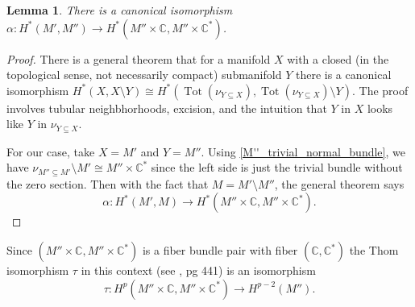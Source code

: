 \documentclass[article,twoside]{article}
\newcommand{\CC}{\mathbb{C}}
\newcommand{\tot}{\operatorname{Tot}}
\theoremstyle{plain}
\theoremstyle{plain}
\newtheorem{lemma}[lemma]{Lemma}
\theoremstyle{plain}
\theoremstyle{plain}
\theoremstyle{plain}
\theoremstyle{definition}
\theoremstyle{definition}
\theoremstyle{definition}
\theoremstyle{remark}
\theoremstyle{remark}
\begin{document}
\begin{lemma}\label{M',M''_trivial_fiber_pair_bundle}
	There is a canonical isomorphism $\alpha:H^*(M',M'')\to H^*(M''\times\CC,M''\times\CC^*)$.
\end{lemma}
\begin{proof}
	There is a general theorem that for a manifold $X$ with a closed (in the topological sense, not necessarily compact) submanifold $Y$ there is a canonical isomorphism $H^*(X,X\setminus Y)\cong H^*(\tot(\nu_{Y\subseteq X}),\tot(\nu_{Y\subseteq X})\setminus {Y})$. The proof involves tubular neighbhorhoods, excision, and the intuition that $Y$ in $X$ looks like ${Y}$ in $\nu_{Y\subseteq X}$. 
	
	For our case, take $X = M'$ and $Y=M''$. Using \autoref{M''_trivial_normal_bundle}, we have $\nu_{M''\subseteq M'}\setminus{M'}\cong M''\times \CC^*$ since the left side is just the trivial bundle without the zero section. Then with the fact that $M = M'\setminus M''$, the general theorem says
	$$
	\alpha: H^*(M',M)\to H^*(M''\times\CC,M''\times\CC^*).
	$$
\end{proof}


%
%
%
%
%
%
%

Since $(M''\times\CC,M''\times\CC^*)$ is a fiber bundle pair with fiber $(\CC,\CC^*)$ the Thom isomorphism $\tau$ in this context (see \cite{hatcher}, pg 441) is an isomorphism
$$
\tau:H^p(M''\times\CC,M''\times\CC^*) \to H^{p-2}(M'').
$$
\end{document}
